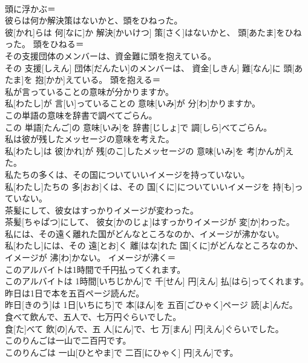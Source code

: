 \documentclass[8pt]{extreport}
\begin{document}
\begin{CJK}{UTF8}{min}
\\	頭に浮かぶ＝ 
\\	彼らは何か解決策はないかと、頭をひねった。	
\\	彼[かれ]らは 何[なに]か 解決[かいけつ] 策[さく]はないかと、 頭[あたま]をひねった。	頭をひねる＝ 
\\	その支援団体のメンバーは、資金難に頭を抱えている。	
\\	その 支援[しえん] 団体[だんたい]のメンバーは、 資金[しきん] 難[なん]に 頭[あたま]を 抱[かか]えている。	頭を抱える＝ 
\\	私が言っていることの意味が分かりますか。	
\\	私[わたし]が 言[い]っていることの 意味[いみ]が 分[わ]かりますか。	
\\	この単語の意味を辞書で調べてごらん。	
\\	この 単語[たんご]の 意味[いみ]を 辞書[じしょ]で 調[しら]べてごらん。	
\\	私は彼が残したメッセージの意味を考えた。	
\\	私[わたし]は 彼[かれ]が 残[のこ]したメッセージの 意味[いみ]を 考[かんが]えた。	
\\	私たちの多くは、その国についていいイメージを持っていない。	
\\	私[わたし]たちの 多[おお]くは、その 国[くに]についていいイメージを 持[も]っていない。	
\\	茶髪にして、彼女はすっかりイメージが変わった。	
\\	茶髪[ちゃぱつ]にして、 彼女[かのじょ]はすっかりイメージが 変[か]わった。	
\\	私には、その遠く離れた国がどんなところなのか、イメージが沸かない。	
\\	私[わたし]には、その 遠[とお]く 離[はな]れた 国[くに]がどんなところなのか、イメージが 沸[わ]かない。	イメージが沸く＝ 
\\	このアルバイトは1時間で千円払ってくれます。	
\\	このアルバイトは 1時間[いちじかん]で 千[せん] 円[えん] 払[はら]ってくれます。	
\\	昨日は1日で本を五百ページ読んだ。	
\\	昨日[きのう]は 1日[いちにち]で 本[ほん]を 五百[ごひゃく]ページ 読[よ]んだ。	
\\	食べて飲んで、五人で、七万円ぐらいでした。	
\\	食[た]べて 飲[の]んで、五 人[にん]で、七 万[まん] 円[えん]ぐらいでした。	
\\	このりんごは一山で二百円です。	
\\	このりんごは 一山[ひとやま]で 二百[にひゃく] 円[えん]です。	

\end{CJK}
\end{document}
